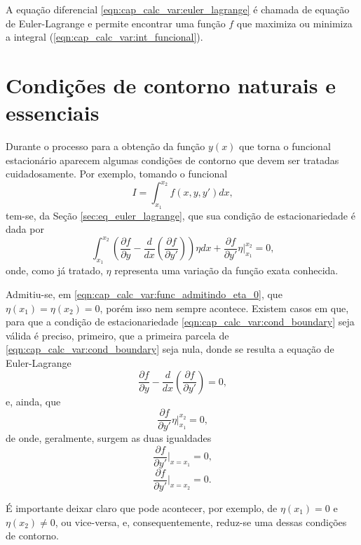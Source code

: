 \documentclass[
	12pt,				%
	openright,			%
    twoside,			%
	a4paper,			%
	chapter=TITLE,		%
	english,			%
	french,				%
	spanish,			%
	brazil				%
	]{abntex2}
\numberwithin{lema}{chapter}
\numberwithin{teorema}{chapter}
\numberwithin{definicao}{chapter}
\numberwithin{exemplo}{chapter}
\numberwithin{figure}{chapter}
\begin{document}
A equação diferencial \eqref{eqn:cap_calc_var:euler_lagrange} é chamada de equação de Euler-Lagrange e permite encontrar uma função $f$ que maximiza ou minimiza a integral (\ref{eqn:cap_calc_var:int_funcional}).

\section{Condições de contorno naturais e essenciais}
\label{sec:cond_contorno}

Durante o processo para a obtenção da função $y(x)$ que torna o funcional estacionário aparecem algumas condições de contorno que devem ser tratadas cuidadosamente. Por exemplo, tomando o funcional
$$
	I=\int_{x_1}^{x_2} f(x, y, y')dx
	\text{,}
$$
tem-se, da Seção \ref{sec:eq_euler_lagrange}, que sua condição de estacionariedade é dada por
\begin{equation}
	\label{eqn:cap_calc_var:cond_boundary}
	\int_{x_1}^{x_2} \left (
		\frac{\partial f}{\partial y}
		-
		\frac{d}{dx} \left (
			\frac{\partial f}{\partial y'}
		\right )
	\right ) \eta dx
	+
	\frac{\partial f}{\partial y'}\eta \Big |_{x_1}^{x_2} = 0
	\text{,}
\end{equation}
onde, como já tratado, $\eta$ representa uma variação da função exata conhecida.

Admitiu-se, em \eqref{eqn:cap_calc_var:func_admitindo_eta_0}, que $\eta(x_1)=\eta(x_2)=0$, porém isso nem sempre acontece. Existem casos em que, para que a condição de estacionariedade \eqref{eqn:cap_calc_var:cond_boundary} seja válida é preciso, primeiro, que a primeira parcela de \eqref{eqn:cap_calc_var:cond_boundary} seja nula, donde se resulta a equação de Euler-Lagrange
$$
	\frac{\partial f}{\partial y}
	-
	\frac{d}{dx}\left (
		\frac{\partial f}{\partial y'}
	\right )
	= 0
	\text{,}
$$
e, ainda, que
$$
	\frac{\partial f}{\partial y'}\eta \Big |_{x_1}^{x_2} = 0
	\text{,}
$$
de onde, geralmente, surgem as duas igualdades
\begin{equation}
	\label{eqn:cap_calc_var:condicao_natural_d1}
	\frac{\partial f}{\partial y'} \Big |_{x=x_1} = 0
	\text{,}
\end{equation}
\begin{equation}
	\label{eqn:cap_calc_var:condicao_natural_d2}
	\frac{\partial f}{\partial y'} \Big |_{x=x_2} = 0
	\text{.}
\end{equation}

É importante deixar claro que pode acontecer, por exemplo, de $\eta(x_1)=0$ e $\eta(x_2)\neq 0$, ou vice-versa, e, consequentemente, reduz-se uma dessas condições de contorno.
\end{document}
